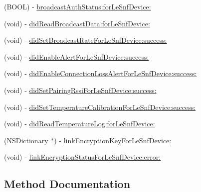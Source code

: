 \begin{DoxyCompactItemize}
(B\+O\+O\+L) -\/ \hyperlink{protocol_le_snf_device_delegate-p_a15dc3cc84e7033bd16ebba3d5a6b79dd}{broadcast\+Auth\+Status\+:for\+Le\+Snf\+Device\+:}
\item 
(void) -\/ \hyperlink{protocol_le_snf_device_delegate-p_adcc32f00c82f3058a16e13cb8a604e00}{did\+Read\+Broadcast\+Data\+:for\+Le\+Snf\+Device\+:}
\item 
(void) -\/ \hyperlink{protocol_le_snf_device_delegate-p_a03a4c1bb3f2f5ceeb568f07e4ac2701a}{did\+Set\+Broadcast\+Rate\+For\+Le\+Snf\+Device\+:success\+:}
\item 
(void) -\/ \hyperlink{protocol_le_snf_device_delegate-p_a8db9b63229567e5a0070b0e931dc73f8}{did\+Enable\+Alert\+For\+Le\+Snf\+Device\+:success\+:}
\item 
(void) -\/ \hyperlink{protocol_le_snf_device_delegate-p_afc094b83edde63bd426132e3f4613d1f}{did\+Enable\+Connection\+Loss\+Alert\+For\+Le\+Snf\+Device\+:success\+:}
\item 
(void) -\/ \hyperlink{protocol_le_snf_device_delegate-p_a9ae9f3e93341495814c6c5166d880fc9}{did\+Set\+Pairing\+Rssi\+For\+Le\+Snf\+Device\+:success\+:}
\item 
(void) -\/ \hyperlink{protocol_le_snf_device_delegate-p_a6f12b376771e7793489e24abff8d9b4e}{did\+Set\+Temperature\+Calibration\+For\+Le\+Snf\+Device\+:success\+:}
\item 
(void) -\/ \hyperlink{protocol_le_snf_device_delegate-p_a1cdd6400b5762c4b909d6960b4d16a5f}{did\+Read\+Temperature\+Log\+:for\+Le\+Snf\+Device\+:}
\item 
(N\+S\+Dictionary $\ast$) -\/ \hyperlink{protocol_le_snf_device_delegate-p_a9a379fb52774107915fddbabc391ce72}{link\+Encryption\+Key\+For\+Le\+Snf\+Device\+:}
\item 
(void) -\/ \hyperlink{protocol_le_snf_device_delegate-p_aaa6f30c0ab6fa349c3409f106b8dc3d5}{link\+Encryption\+Status\+For\+Le\+Snf\+Device\+:error\+:}
\end{DoxyCompactItemize}


\subsection{Method Documentation}
\hypertarget{protocol_le_snf_device_delegate-p_a3f037b89e95522cb13151d1d659a0dc8}{}
